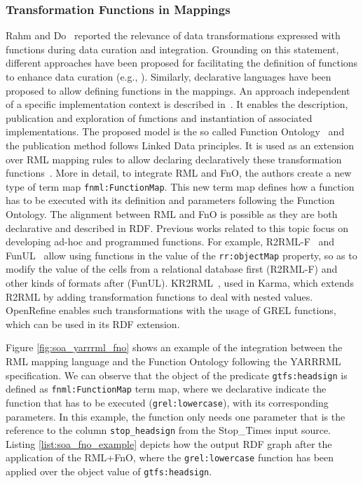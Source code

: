 \subsubsection{Transformation Functions in Mappings}
\label{soa2:functions}
Rahm and Do~\citep{rahm2000data} reported the relevance of data transformations expressed with functions during data curation and integration. Grounding on this statement, different approaches have been proposed for facilitating the definition of functions to enhance data curation (e.g., \citep{galhardas2001declarative,GuptaSKGTM12,raman2001potter}). Similarly, declarative languages have been proposed to allow defining functions in the mappings. An approach independent of a specific implementation context is described in~\citep{demeester2019implementation}. It enables the description, publication and exploration of functions and instantiation of associated implementations. The proposed model is the so called Function Ontology~\citep{de2016ontology} and the publication method follows Linked Data principles. It is used as an extension over RML mapping rules to allow declaring declaratively these transformation functions~\citep{de2017declarative}. More in detail, to integrate RML and FnO, the authors create a new type of term map \texttt{fnml:FunctionMap}. This new term map defines how a function has to be executed with its definition and parameters following the Function Ontology. The alignment between RML and FnO is possible as they are both declarative and described in RDF. Previous works related to this topic focus on developing ad-hoc and programmed functions. For example, R2RML-F~\citep{debruyne2016r2rml} and FunUL~\citep{junior2016funul,junior2016incorporating} allow using functions in the value of the \texttt{rr:objectMap} property, so as to modify the value of the cells from a relational database first (R2RML-F) and other kinds of formats after (FunUL). KR2RML~\citep{slepicka2015kr2rml}, used in Karma, which extends R2RML by adding transformation functions to deal with nested values. OpenRefine enables such transformations with the usage of GREL functions, which can be used in its RDF extension. 


Figure \ref{fig:soa_yarrrml_fno} shows an example of the integration between the RML mapping language and the Function Ontology following the YARRRML specification. We can observe that the object of the predicate \texttt{gtfs:headsign} is defined as \texttt{fnml:FunctionMap} term map, where we declarative indicate the function that has to be executed (\texttt{grel:lowercase}), with its corresponding parameters. In this example, the function only needs one parameter that is the reference to the column \texttt{stop\_headsign} from the Stop\_Times input source. Listing \ref{list:soa_fno_example} depicts how the output RDF graph after the application of the RML+FnO, where the \texttt{grel:lowercase} function has been applied over the object value of \texttt{gtfs:headsign}.

